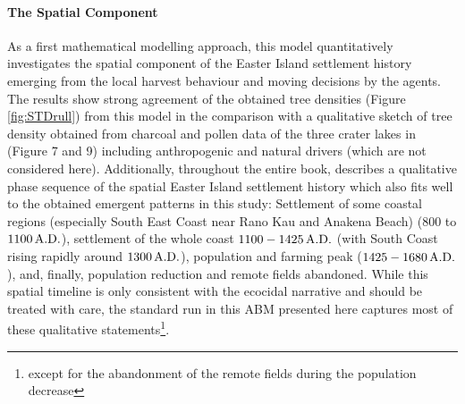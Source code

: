 \paragraph{The Spatial Component}
As a first mathematical modelling approach, this model quantitatively investigates the spatial component of the Easter Island settlement history emerging from the local harvest behaviour and moving decisions by the agents.
The results show strong agreement of the obtained tree densities (Figure \ref{fig:STDrull}) from this model in the comparison with a qualitative sketch of tree density obtained from charcoal and pollen data of the three crater lakes in \citet{Rull2020} (Figure 7 and 9) including anthropogenic and natural drivers (which are not considered here).
Additionally, throughout the entire book, \citet{Bahn2017} describes a qualitative phase sequence of the spatial Easter Island settlement history which also fits well to the obtained emergent patterns in this study:
Settlement of some coastal regions (especially South East Coast near Rano Kau and Anakena Beach) ($800$ to $1100\, {\rm A.D.}$), settlement of the whole coast $1100-1425\,{\rm A.D.}$ (with South Coast rising rapidly around $1300\, {\rm A.D.}$), population and farming peak ($1425-1680\, {\rm A.D.}$), and, finally, population reduction and remote fields abandoned.
While this spatial timeline is only consistent with the ecocidal narrative and should be treated with care, the standard run in this ABM presented here captures most of these qualitative statements\footnote{except for the abandonment of the remote fields during the population decrease}.




 
